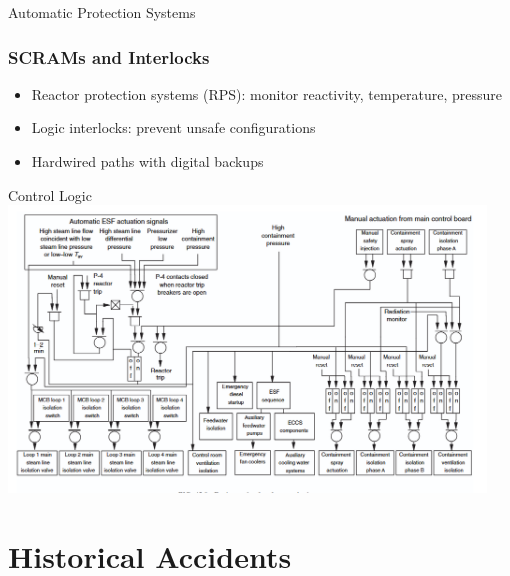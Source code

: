 \documentclass{beamer}
\begin{document}
\begin{frame}{Automatic Protection Systems}
  \subsubsection*{SCRAMs and Interlocks}
  \begin{itemize}
    \item Reactor protection systems (RPS): monitor reactivity, temperature, pressure
    \item Logic interlocks: prevent unsafe configurations
    \item Hardwired paths with digital backups
  \end{itemize}
\end{frame}
\begin{frame}{Control Logic}
  \centering
  \includegraphics[width=0.95\textwidth]{safetylogic}
\end{frame}

\section{Historical Accidents}
\end{document}
